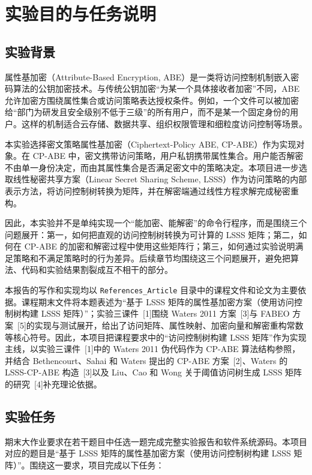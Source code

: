 \chapter{实验目的与任务说明}

\section{实验背景}

属性基加密（Attribute-Based Encryption, ABE）是一类将访问控制机制嵌入密码算法的公钥加密技术。与传统公钥加密“为某一个具体接收者加密”不同，ABE 允许加密方围绕属性集合或访问策略表达授权条件。例如，一个文件可以被加密给“部门为研发且安全级别不低于三级”的所有用户，而不是某一个固定身份的用户。这样的机制适合云存储、数据共享、组织权限管理和细粒度访问控制等场景。

本实验选择密文策略属性基加密（Ciphertext-Policy ABE, CP-ABE）作为实现对象。在 CP-ABE 中，密文携带访问策略，用户私钥携带属性集合。用户能否解密不由单一身份决定，而由其属性集合是否满足密文中的策略决定。本项目进一步选取线性秘密共享方案（Linear Secret Sharing Scheme, LSSS）作为访问策略的内部表示方法，将访问控制树转换为矩阵，并在解密端通过线性方程求解完成秘密重构。

因此，本实验并不是单纯实现一个“能加密、能解密”的命令行程序，而是围绕三个问题展开：第一，如何把直观的访问控制树转换为可计算的 LSSS 矩阵；第二，如何在 CP-ABE 的加密和解密过程中使用这些矩阵行；第三，如何通过实验说明满足策略和不满足策略时的行为差异。后续章节均围绕这三个问题展开，避免把算法、代码和实验结果割裂成互不相干的部分。

本报告的写作和实现均以 \verb|References_Article| 目录中的课程文件和论文为主要依据。课程期末文件将本题表述为“基于 LSSS 矩阵的属性基加密方案（使用访问控制树构建 LSSS 矩阵）”；实验三课件~[1]围绕 Waters 2011 方案~[3]与 FABEO 方案~[5]的实现与测试展开，给出了访问矩阵、属性映射、加密向量和解密重构常数等核心符号。因此，本项目把课程要求中的“访问控制树构建 LSSS 矩阵”作为实现主线，以实验三课件~[1]中的 Waters 2011 伪代码作为 CP-ABE 算法结构参照，并结合 Bethencourt、Sahai 和 Waters 提出的 CP-ABE 方案~[2]、Waters 的 LSSS-CP-ABE 构造~[3]以及 Liu、Cao 和 Wong 关于阈值访问树生成 LSSS 矩阵的研究~[4]补充理论依据。

\section{实验任务}

期末大作业要求在若干题目中任选一题完成完整实验报告和软件系统源码。本项目对应的题目是“基于 LSSS 矩阵的属性基加密方案（使用访问控制树构建 LSSS 矩阵）”。围绕这一要求，项目完成以下任务：

